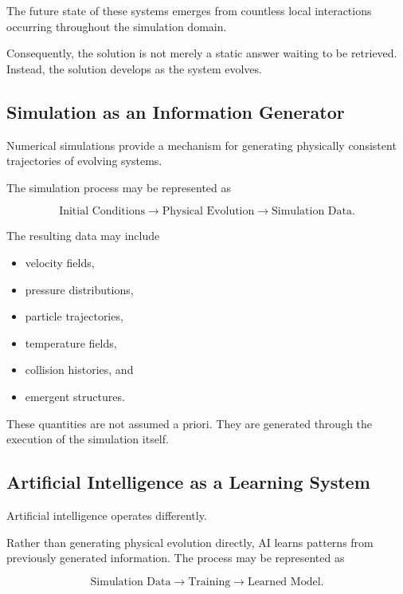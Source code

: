 \documentclass[11pt]{article}
\begin{document}
The future state of these systems emerges from countless local
interactions occurring throughout the simulation domain.

Consequently, the solution is not merely a static answer waiting to be
retrieved. Instead, the solution develops as the system evolves.

\subsection{Simulation as an Information Generator}

Numerical simulations provide a mechanism for generating physically
consistent trajectories of evolving systems.

The simulation process may be represented as

\begin{equation}
\text{Initial Conditions}
\rightarrow
\text{Physical Evolution}
\rightarrow
\text{Simulation Data}.
\end{equation}

The resulting data may include

\begin{itemize}
\item velocity fields,
\item pressure distributions,
\item particle trajectories,
\item temperature fields,
\item collision histories, and
\item emergent structures.
\end{itemize}

These quantities are not assumed a priori. They are generated through
the execution of the simulation itself.

\subsection{Artificial Intelligence as a Learning System}

Artificial intelligence operates differently.

Rather than generating physical evolution directly, AI learns patterns
from previously generated information. The process may be represented as

\begin{equation}
\text{Simulation Data}
\rightarrow
\text{Training}
\rightarrow
\text{Learned Model}.
\end{equation}
\end{document}
